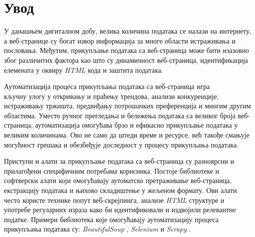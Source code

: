 \documentclass[12pt,oneside]{memoir}
\begin{document}
\frontmatter
\naslovna
\komisija
\apstrakt

\tableofcontents*

\mainmatter

\chapter{Увод}
У данашњем дигиталном добу, велика количина података се налази на интернету, а веб-странице су богат извор информација за многе области истраживања и пословања. Међутим, прикупљање података са веб-страница може бити изазовно због различитих фактора као што су динамичност веб-страница, идентификација елемената у оквиру \textit{HTML} кода и заштита података.

Аутоматизација процеса прикупљања података са веб-страница игра\\кључну улогу у откривању и праћењу трендова, анализи конкуренције, истраживању тржишта, предвиђању потрошачких преференција и многим другим областима. Уместо ручног прегледања и бележења података са великог броја веб-страница, аутоматизација омогућава брзо и ефикасно прикупљање података у великим количинама. Ово не само да штеди време и ресурсе, већ такође смањује могућност грешака и обезбеђује доследност у процесу прикупљања података.

Приступи и алати за прикупљање података са веб-страница су разноврсни и прилагођени специфичним потребама корисника. Постоје библиотеке и софтверски алати који омогућавају аутоматско претраживање веб-страница, екстракцију података и њихово складиштење у жељеном формату. Ови алати често користе технике попут веб-скрејпинга, анализе \textit{HTML} структуре и употребе регуларних израза како би идентификовали и издвојили релевантне податке. Примери библиотека које омогућавају аутоматизацију процеса
прикупљања података су: \textit{BeautifulSoup} \cite{beautifulSoapDocs}, \textit{Selenium} 
 \cite{selenium} и \textit{Scrapy} \cite{scrapy}.
\end{document}
